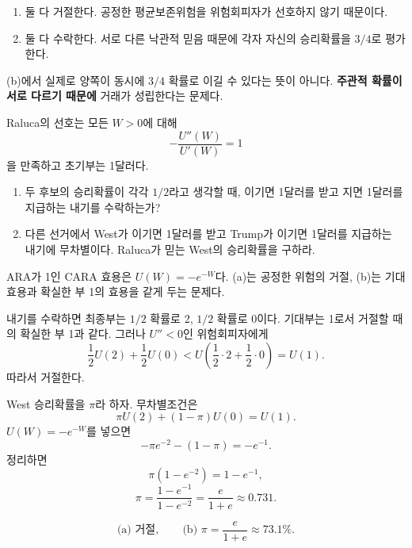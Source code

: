 \begin{answerbox}
\begin{enumerate}[label=(\alph*)]
\item 둘 다 거절한다. 공정한 평균보존위험을 위험회피자가 선호하지 않기 때문이다.
\item 둘 다 수락한다. 서로 다른 낙관적 믿음 때문에 각자 자신의 승리확률을 $3/4$로 평가한다.
\end{enumerate}
\end{answerbox}

\begin{warningbox}
(b)에서 실제로 양쪽이 동시에 $3/4$ 확률로 이길 수 있다는 뜻이 아니다. \textbf{주관적 확률이 서로 다르기 때문에} 거래가 성립한다는 문제다.
\end{warningbox}

\begin{officialbox}
Raluca의 선호는 모든 $W>0$에 대해
\[
-\frac{U''(W)}{U'(W)}=1
\]
을 만족하고 초기부는 1달러다.
\begin{enumerate}[label=(\alph*)]
\item 두 후보의 승리확률이 각각 $1/2$라고 생각할 때, 이기면 1달러를 받고 지면 1달러를 지급하는 내기를 수락하는가?
\item 다른 선거에서 West가 이기면 1달러를 받고 Trump가 이기면 1달러를 지급하는 내기에 무차별이다. Raluca가 믿는 West의 승리확률을 구하라.
\end{enumerate}
\end{officialbox}

\begin{strategybox}
ARA가 1인 CARA 효용은 $U(W)=-e^{-W}$다. (a)는 공정한 위험의 거절, (b)는 기대효용과 확실한 부 1의 효용을 같게 두는 문제다.
\end{strategybox}

\begin{solutionbox}
내기를 수락하면 최종부는 $1/2$ 확률로 2, $1/2$ 확률로 0이다. 기대부는 1로서 거절할 때의 확실한 부 1과 같다. 그러나 $U''<0$인 위험회피자에게
\[
\frac12U(2)+\frac12U(0)<U\left(\frac12\cdot2+\frac12\cdot0\right)=U(1).
\]
따라서 거절한다.

West 승리확률을 $\pi$라 하자. 무차별조건은
\[
\pi U(2)+(1-\pi)U(0)=U(1).
\]
$U(W)=-e^{-W}$를 넣으면
\[
-\pi e^{-2}-(1-\pi)=-e^{-1}.
\]
정리하면
\[
\pi(1-e^{-2})=1-e^{-1},
\]
\[
\pi=\frac{1-e^{-1}}{1-e^{-2}}
=\frac{e}{1+e}\approx0.731.
\]
\end{solutionbox}

\begin{answerbox}
\[
\text{(a) 거절},\qquad
\text{(b) }\boxed{\pi=\frac{e}{1+e}\approx73.1\%}.
\]
\end{answerbox}

